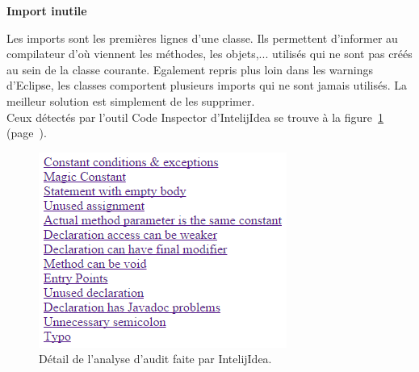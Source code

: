 \documentclass[12pt,a4paper,final]{article}
\newcommand{\smalltitle}[1]{\bigskip\large\textbf{#1}\par\normalsize\medskip}
\newcommand{\labelfigure}[1]{figure~\ref{#1} (page~\pageref{#1})}
\begin{document}
\smalltitle{Import inutile}
Les imports sont les premières lignes d'une classe. Ils permettent d'informer au compilateur d'où viennent les méthodes, les objets,... utilisés qui ne sont pas créés au sein de la classe courante.
Egalement repris plus loin dans les warnings d'Eclipse, les classes comportent plusieurs imports qui ne sont jamais utilisés.
La meilleur solution est simplement de les supprimer.\\
Ceux détectés par l'outil Code Inspector d'IntelijIdea  se trouve à la \labelfigure{Audit}. 
\begin{figure}[!h]
	\centering
	\includegraphics[width=\textwidth]{AuditII.png}
	\caption{\label{Audit}Détail de l'analyse d'audit faite par IntelijIdea.}
\end{figure}
\end{document}
